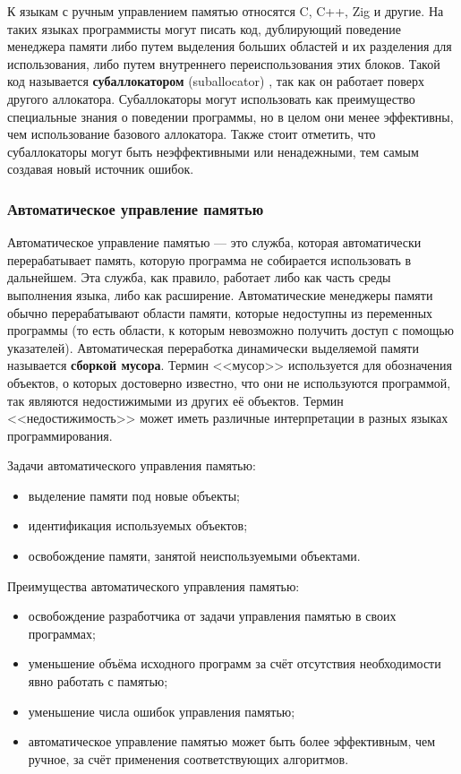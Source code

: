 К языкам с ручным управлением памятью относятся C, C++, Zig и другие. На таких языках программисты могут писать код, дублирующий поведение менеджера памяти либо путем выделения больших областей и их разделения для использования, либо путем внутреннего переиспользования этих блоков. Такой код называется \textbf{субаллокатором} (suballocator) \cite{glossary}, так как он работает поверх другого аллокатора. Субаллокаторы могут использовать как преимущество специальные знания о поведении программы, но в целом они менее эффективны, чем использование базового аллокатора. Также стоит отметить, что субаллокаторы могут быть неэффективными или ненадежными, тем самым создавая новый источник ошибок. \cite{allocator}



\subsubsection{Автоматическое управление памятью}

Автоматическое управление памятью \cite{mm_overview} --- это служба, которая автоматически перерабатывает память, которую программа не собирается использовать в дальнейшем. Эта служба, как правило, работает либо как часть среды выполнения языка, либо как расширение. Автоматические менеджеры памяти обычно перерабатывают области памяти, которые недоступны из переменных программы (то есть области, к которым невозможно получить доступ с помощью указателей). Автоматическая переработка динамически выделяемой памяти называется \textbf{сборкой мусора}. Термин <<мусор>> используется для обозначения объектов, о которых достоверно известно, что они не используются программой, так являются недостижимыми из других её объектов. Термин <<недостижимость>> может иметь различные интерпретации в разных языках программирования. \cite{glossary}

Задачи автоматического управления памятью: 

\begin{itemize}[label*=---]
	\item выделение памяти под новые объекты;
	\item идентификация используемых объектов;
	\item освобождение памяти, занятой неиспользуемыми объектами.
\end{itemize}

Преимущества автоматического управления памятью: 

\begin{itemize}[label*=---]
	\item освобождение разработчика от задачи управления памятью в своих программах;
	\item уменьшение объёма исходного программ за счёт отсутствия необходимости явно работать с памятью;
	\item уменьшение числа ошибок управления памятью;
	\item автоматическое управление памятью может быть более эффективным, чем ручное, за счёт применения соответствующих алгоритмов.
\end{itemize}

